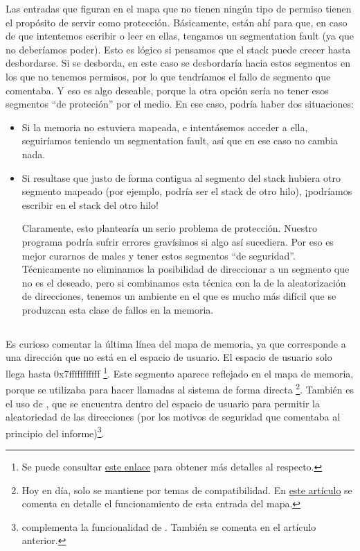 \documentclass[a4paper]{article}
\begin{document}
Las entradas que figuran en el mapa que no tienen ningún tipo de permiso tienen el propósito de servir como protección. Básicamente, están ahí para que, en caso de que intentemos escribir o leer en ellas, tengamos un segmentation fault (ya que no deberíamos poder). Esto es lógico si pensamos que el stack puede crecer hasta desbordarse. Si se desborda, en este caso se desbordaría hacia estos segmentos en los que no tenemos permisos, por lo que tendríamos el fallo de segmento que comentaba. Y eso es algo deseable, porque la otra opción sería no tener esos segmentos ``de proteción'' por el medio. En ese caso, podría haber dos situaciones:
\begin{itemize}
    \item Si la memoria no estuviera mapeada, e intentásemos acceder a ella, seguiríamos teniendo un segmentation fault, así que en ese caso no cambia nada.
    \item Si resultase que justo de forma contigua al segmento del stack hubiera otro segmento mapeado (por ejemplo, podría ser el stack de otro hilo), ¡podríamos escribir en el stack del otro hilo!
    
    Claramente, esto plantearía un serio problema de protección. Nuestro programa podría sufrir errores gravísimos si algo así sucediera. Por eso es mejor curarnos de males y tener estos segmentos ``de seguridad''. Técnicamente no eliminamos la posibilidad de direccionar a un segmento que no es el deseado, pero si combinamos esta técnica con la de la aleatorización de direcciones, tenemos un ambiente en el que es mucho más difícil que se produzcan esta clase de fallos en la memoria.
\end{itemize}

\subsection{{\ttfamily [vsyscall]}}

Es curioso comentar la última línea del mapa de memoria, ya que corresponde a una dirección que no está en el espacio de usuario. El espacio de usuario solo llega hasta {\ttfamily 0x7fffffffffff} \footnote{Se puede consultar \href{https://www.kernel.org/doc/Documentation/x86/x86_64/mm.txt}{este enlace} para obtener más detalles al respecto.}. Este segmento aparece reflejado en el mapa de memoria, porque se utilizaba para hacer llamadas al sistema de forma directa \footnote{Hoy en día, solo se mantiene por temas de compatibilidad. En \href{https://lwn.net/Articles/446528/}{este artículo} se comenta en detalle el funcionamiento de esta entrada del mapa.}. También es el uso de {\ttfamily [vdso]}, que se encuentra dentro del espacio de usuario para permitir la aleatoriedad de las direcciones (por los motivos de seguridad que comentaba al principio del informe)\footnote{{\ttfamily [vvar]} complementa la funcionalidad de {\ttfamily [vdso]}. También se comenta en el artículo anterior.}.
\end{document}
